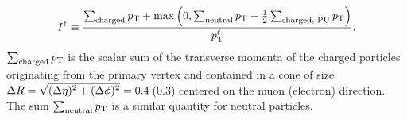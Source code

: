 \begin{equation}
I^{\ell} \equiv \frac{\sum_\text{charged}  p_{\mathrm{T}} + \max\left( 0, \sum_\text{neutral}  p_{\mathrm{T}}
                                         - \frac{1}{2} \sum_\text{charged, PU} p_{\mathrm{T}}  \right )}{p_{\mathrm{T}}^{\ell}}.
\label{eq:reconstruction_isolation}
\end{equation}
$\sum_\text{charged}  p_{\mathrm{T}}$ is the scalar sum of the
transverse momenta of the charged particles originating from
the primary vertex and contained in a cone of size
$\Delta R = \sqrt{\smash[b]{(\Delta \eta)^2 + (\Delta \phi)^2}} = 0.4$\,(0.3)
centered on the muon (electron) direction. The sum $\sum_\text{neutral}  p_{\mathrm{T}}$ is
a similar quantity for neutral particles.



